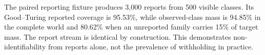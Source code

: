 The paired reporting fixture produces 3,000 reports from 500 visible classes. Its Good--Turing reported coverage is 95.53\%, while observed-class mass is 94.85\% in the complete world and 80.62\% when an unreported family carries 15\% of target mass. The report stream is identical by construction. This demonstrates non-identifiability from reports alone, not the prevalence of withholding in practice.
